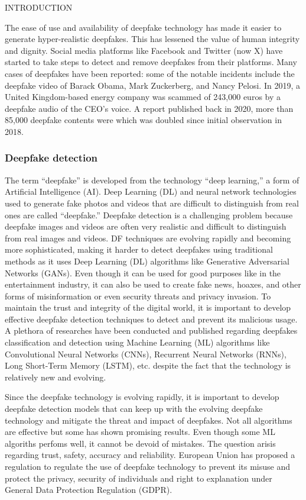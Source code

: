 \begin{section}[]{\uppercase{Introduction}}
    \par
    The ease of use and availability of deepfake technology has made it easier to generate hyper-realistic deepfakes. This has lessened the value of human integrity and dignity. Social media platforms like Facebook and Twitter (now X) have started to take steps to detect and remove deepfakes from their platforms. 
    Many cases of deepfakes have been reported: some of the notable incidents include the deepfake video of Barack Obama, Mark Zuckerberg, and Nancy Pelosi. In 2019, a United Kingdom-based energy company was scammed of 243,000 euros by a deepfake audio of the CEO's voice. \cite{Damiani2019}
    A report published back in 2020, more than 85,000 deepfake contents were which was doubled since initial observation in 2018. \cite{CyberNews2021}

    \subsubsection{Deepfake detection}
    The term “deepfake” is developed from the technology “deep learning,” a form of Artificial Intelligence (AI). Deep Learning (DL) and neural network technologies used to generate fake photos and
    videos that are difficult to distinguish from real ones are called “deepfake.” Deepfake detection is a challenging problem because deepfake images and videos are often very realistic and difficult to distinguish from real images and videos. 
    DF techniques are evolving rapidly and becoming more sophisticated, making it harder to detect deepfakes using traditional methods as it uses Deep Learning (DL) algorithms like Generative Adversarial Networks (GANs).
    Even though it can be used for good purposes like in the entertainment industry, it can also be used to create fake news, hoaxes, and other forms of misinformation or even security threats and privacy invasion.
    To maintain the trust and integrity of the digital world, it is important to develop effective deepfake detection techniques to detect and prevent its malicious usage. \cite{Korshunov2019}
    A plethora of researches have been conducted and published regarding deepfakes classification and detection using Machine Learning (ML) algorithms like Convolutional Neural Networks (CNNs), Recurrent Neural Networks (RNNs), Long Short-Term Memory (LSTM), etc. despite the fact that the technology is relatively new and evolving.

    \par Since the deepfake technology is evolving rapidly, it is important to develop deepfake detection models that can keep up with the evolving deepfake technology and mitigate the threat and impact of deepfakes. Not all algorithms are effective but some has shown promising results. Even though some ML algoriths perfoms well, it cannot be devoid of mistakes. The question arisis regarding trust, safety, accuracy and reliability. 
    European Union has proposed a regulation to regulate the use of deepfake technology to prevent its misuse and protect the privacy, security of individuals and right to explanation under General Data Protection Regulation (GDPR). \cite{Goodman2017}


\end{section}
